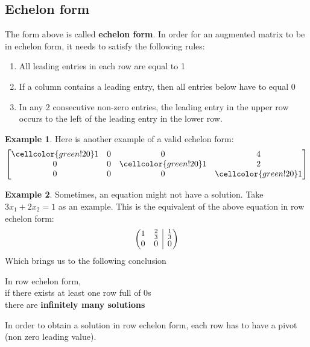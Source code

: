 \documentclass[table]{article}
\makeatletter
\theoremstyle{definition}
\newtheorem{ex}{Example}[section]
\newenvironment{amatrix}[1]{%
  \left(\begin{array}{@{}*{#1}{c}|c@{}}
}{%
  \end{array}\right)
}
\newcommand\green{\cellcolor{green!20}}
\makeatother
\begin{document}
  \subsection{Echelon form}
  The form above is called \textbf{echelon form}. In order for an augmented matrix to be in echelon form, it needs to satisfy the following rules:
  \begin{enumerate}
    \item All leading entries in each row are equal to 1
    \item If a column contains a leading entry, then all entries below have to equal 0
    \item In any 2 consecutive non-zero entries, the leading entry in the upper row occurs to the left of the leading entry in the lower row.
  \end{enumerate}
  \begin{ex}
    Here is another example of a valid echelon form:
  \[
   \begin{bmatrix}
     \green 1 & 0 & 0 & 4 \\
     0 & 0 & \green 1 & 2 \\
     0 & 0 & 0 & \green 1 \\
   \end{bmatrix} 
  \]
\end{ex}

\begin{ex}
  Sometimes, an equation might not have a solution. Take $3x_1+2x_2=1$ as an example.
  This is the equivalent of the above equation in row echelon form:
  \[
    \begin{amatrix}{2}
      1 & \frac{2}{3} & \frac{1}{3} \\
      0 & 0 & 0 \\
    \end{amatrix}
  \]
  Which brings us to the following conclusion
\end{ex}
\begin{center}
  In row echelon form, \\
  if there exists at least one row full of 0s \\
  there are \textbf{infinitely many solutions}
\end{center}
  
  In order to obtain a solution in row echelon form, each row has to have a pivot (non zero leading value).
  
  
  
\end{document}
